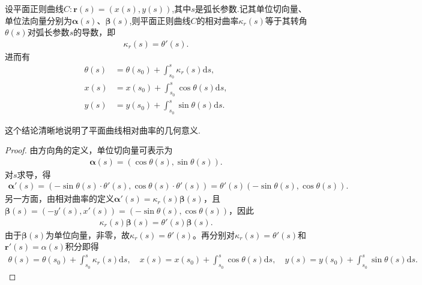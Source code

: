 \documentclass[../../main.tex]{subfiles}%
\begin{document}
\begin{theorem}\label{theorem:平面曲线转角和相对曲率参数方程的联系}
设平面正则曲线$C:\bm{r}(s)=(x(s),y(s))$,其中$s$是弧长参数.记其单位切向量、单位法向量分别为$\bm{\alpha}(s)$、$\bm{\beta}(s)$,则平面正则曲线$C$的相对曲率$\kappa_r(s)$等于其转角$\theta(s)$对弧长参数$s$的导数，即
\begin{align*}
\kappa_r(s)=\theta'(s).
\end{align*}
进而有
\begin{align*}
\theta \left( s \right) &= \theta \left( s_0 \right) +\int_{s_0}^s{\kappa _r\left( s \right) \mathrm{d}s},
\\
x\left( s \right) &= x\left( s_0 \right) +\int_{s_0}^s{\cos \theta \left( s \right) \mathrm{d}s},
\\
y\left( s \right) &= y\left( s_0 \right) +\int_{s_0}^s{\sin \theta \left( s \right) \mathrm{d}s}.
\end{align*}
\end{theorem}
\begin{remark}
这个结论清晰地说明了平面曲线相对曲率的几何意义.
\end{remark}
\begin{proof}

由方向角的定义，单位切向量可表示为
\begin{align*}
\bm{\alpha}(s)=(\cos\theta(s),\sin\theta(s)).
\end{align*}
对$s$求导，得
\begin{align*}
\bm{\alpha}'(s)=(-\sin\theta(s)\cdot\theta'(s),\cos\theta(s)\cdot\theta'(s))=\theta'(s)(-\sin\theta(s),\cos\theta(s)).
\end{align*}
另一方面，由相对曲率的定义$\bm{\alpha}'(s)=\kappa_r(s)\bm{\beta}(s)$，且$\bm{\beta}(s)=(-y'(s),x'(s))=(-\sin\theta(s),\cos\theta(s))$，因此
\begin{align*}
\kappa_r(s)\bm{\beta}(s)=\theta'(s)\bm{\beta}(s).
\end{align*}
由于$\bm{\beta}(s)$为单位向量，非零，故$\kappa_r(s)=\theta'(s)$。再分别对$\kappa_r(s)=\theta'(s)$和$\bm{r}'(s)=\alpha(s)$积分即得
\begin{align*}
\theta \left( s \right) = \theta \left( s_0 \right) +\int_{s_0}^s{\kappa _r\left( s \right) \mathrm{d}s},
\quad
x\left( s \right) = x\left( s_0 \right) +\int_{s_0}^s{\cos \theta \left( s \right) \mathrm{d}s},
\quad
y\left( s \right) = y\left( s_0 \right) +\int_{s_0}^s{\sin \theta \left( s \right) \mathrm{d}s}.
\end{align*}

\end{proof}
\end{document}
